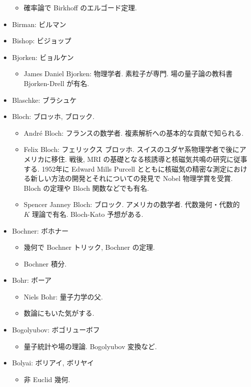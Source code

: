 \documentclass[openany, a4paper, oneside]{jsbook}
\begin{document}
\begin{itemize}
\begin{itemize}
\item 確率論で Birkhoff のエルゴード定理.
\end{itemize}
\item Birman: ビルマン
\item Bishop: ビジョップ
\item Bjorken: ビョルケン
\begin{itemize}
\item James Daniel Bjorken: 物理学者. 素粒子が専門. 場の量子論の教科書Bjorken-Drell が有名.
\end{itemize}
\item Blaschke: ブラシュケ
\item Bloch: ブロッホ, ブロック.
\begin{itemize}
\item Andr\'e Bloch: フランスの数学者. 複素解析への基本的な貢献で知られる.
\item Felix Bloch: フェリックス ブロッホ. スイスのユダヤ系物理学者で後にアメリカに移住. 戦後, MRI の基礎となる核誘導と核磁気共鳴の研究に従事する. 1952年に Edward Mills Purcell とともに核磁気の精密な測定における新しい方法の開発とそれについての発見で Nobel 物理学賞を受賞. Bloch の定理や Bloch 関数などでも有名.
\item Spencer Janney Bloch: ブロック. アメリカの数学者. 代数幾何・代数的 $K$ 理論で有名. Bloch-Kato 予想がある.
\end{itemize}
\item Bochner: ボホナー
\begin{itemize}
\item 幾何で Bochner トリック, Bochner の定理.
\item Bochner 積分.
\end{itemize}
\item Bohr: ボーア
\begin{itemize}
\item Niels Bohr: 量子力学の父.
\item 数論にもいた気がする.
\end{itemize}
\item Bogolyubov: ボゴリューボフ
\begin{itemize}
\item 量子統計や場の理論. Bogolyubov 変換など.
\end{itemize}
\item Bolyai: ボリアイ, ボリヤイ
\begin{itemize}
\item 非 Euclid 幾何.
\end{itemize}

\end{itemize}
\end{document}
